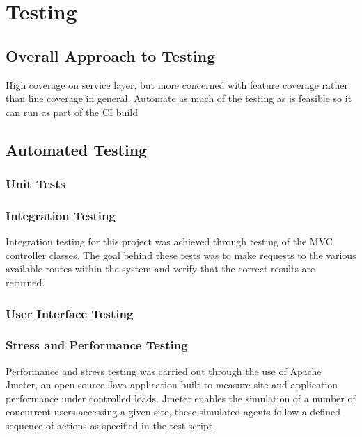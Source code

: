 \chapter{Testing}

\section{Overall Approach to Testing}

High coverage on service layer, but more concerned with feature coverage rather than line coverage in general. Automate as much of the testing as is feasible so it can run as part of the CI build 

\section{Automated Testing}

\subsection{Unit Tests}
\subsection{Integration Testing}

Integration testing for this project was achieved through testing of the MVC controller classes. The goal behind these tests was to make requests to the various available routes within the system and verify that the correct results are returned. 


\lstjava



\subsection{User Interface Testing}

\subsection{Stress and Performance Testing}

Performance and stress testing was carried out through the use of Apache Jmeter\cite{_jmeter}, an open source Java application built to measure site and application performance under controlled loads. Jmeter enables the simulation of a number of concurrent users accessing a given site, these simulated agents follow a defined sequence of actions as specified in the test script. 

